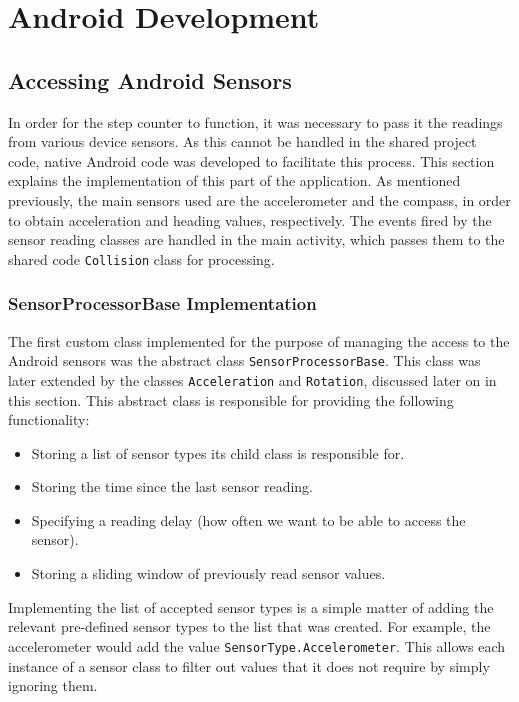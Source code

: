 \documentclass[main.tex]{subfiles}
\begin{document}
\section{Android Development}
    \subsection{Accessing Android Sensors}
        In order for the step counter to function, it was necessary to pass it the readings from various device sensors. As this cannot be handled in the shared
        project code, native Android code was developed to facilitate this process. This section explains the implementation of this part of the application. As
        mentioned previously, the main sensors used are the accelerometer and the compass, in order to obtain acceleration and heading values, respectively.
        The events fired by the sensor reading classes are handled in the main activity, which passes them to the shared code \texttt{Collision} class for processing.
        \subsubsection{SensorProcessorBase Implementation}
            The first custom class implemented for the purpose of managing the access to the Android sensors was the abstract class
            \texttt{SensorProcessorBase}. This class was later extended by the classes \texttt{Acceleration} and \texttt{Rotation}, discussed
            later on in this section. This abstract class is responsible for providing the following functionality:
            \begin{itemize}
                \item Storing a list of sensor types its child class is responsible for.
                \item Storing the time since the last sensor reading.
                \item Specifying a reading delay (how often we want to be able to access the sensor).
                \item Storing a sliding window of previously read sensor values.
            \end{itemize}
            Implementing the list of accepted sensor types is a simple matter of adding the relevant pre-defined sensor types to the list that was created. For example,
            the accelerometer would add the value \texttt{SensorType.Accelerometer}. This allows each instance of a sensor class to filter out values that it does not
            require by simply ignoring them.
            
\end{document}
